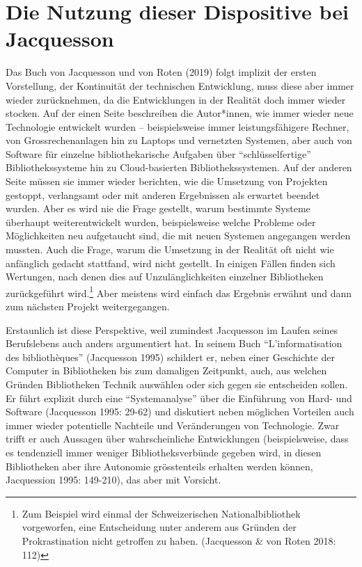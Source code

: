 \documentclass[a4paper,
fontsize=11pt,
oneside,
numbers=noperiodatend,
parskip=half-,
bibliography=totoc,
final
]{scrartcl}
\begin{document}
\hypertarget{die-nutzung-dieser-dispositive-bei-jacquesson}{%
\section{Die Nutzung dieser Dispositive bei
Jacquesson}\label{die-nutzung-dieser-dispositive-bei-jacquesson}}

Das Buch von Jacquesson und von Roten (2019) folgt implizit der ersten
Vorstellung, der Kontinuität der technischen Entwicklung, muss diese
aber immer wieder zurücknehmen, da die Entwicklungen in der Realität
doch immer wieder stocken. Auf der einen Seite beschreiben die
Autor*innen, wie immer wieder neue Technologie entwickelt wurden --
beispielsweise immer leistungsfähigere Rechner, von Grossrechenanlagen
hin zu Laptops und vernetzten Systemen, aber auch von Software für
einzelne bibliothekarische Aufgaben über \enquote{schlüsselfertige}
Bibliothekssysteme hin zu Cloud-basierten Bibliothekssystemen. Auf der
anderen Seite müssen sie immer wieder berichten, wie die Umsetzung von
Projekten gestoppt, verlangsamt oder mit anderen Ergebnissen als
erwartet beendet wurden. Aber es wird nie die Frage gestellt, warum
bestimmte Systeme überhaupt weiterentwickelt wurden, beispielsweise
welche Probleme oder Möglichkeiten neu aufgetaucht sind, die mit neuen
Systemen angegangen werden mussten. Auch die Frage, warum die Umsetzung
in der Realität oft nicht wie anfänglich gedacht stattfand, wird nicht
gestellt. In einigen Fällen finden sich Wertungen, nach denen dies auf
Unzulänglichkeiten einzelner Bibliotheken zurückgeführt wird.\footnote{Zum
  Beispiel wird einmal der Schweizerischen Nationalbibliothek
  vorgeworfen, eine Entscheidung unter anderem aus Gründen der
  Prokrastination nicht getroffen zu haben. (Jacquesson \& von Roten
  2018: 112)} Aber meistens wird einfach das Ergebnis erwähnt und dann
zum nächsten Projekt weitergegangen.

Erstaunlich ist diese Perspektive, weil zumindest Jacquesson im Laufen
seines Berufslebens auch anders argumentiert hat. In seinem Buch
\enquote{L'informatisation des bibliothèques} (Jacquesson 1995)
schildert er, neben einer Geschichte der Computer in Bibliotheken bis
zum damaligen Zeitpunkt, auch, aus welchen Gründen Bibliotheken Technik
auswählen oder sich gegen sie entscheiden sollen. Er führt explizit
durch eine \enquote{Systemanalyse} über die Einführung von Hard- und
Software (Jacquesson 1995: 29-62) und diskutiert neben möglichen
Vorteilen auch immer wieder potentielle Nachteile und Veränderungen von
Technologie. Zwar trifft er auch Aussagen über wahrscheinliche
Entwicklungen (beispielsweise, dass es tendenziell immer weniger
Bibliotheksverbünde gegeben wird, in diesen Bibliotheken aber ihre
Autonomie grösstenteils erhalten werden können, Jacquession 1995:
149-210), das aber mit Vorsicht.
\end{document}
